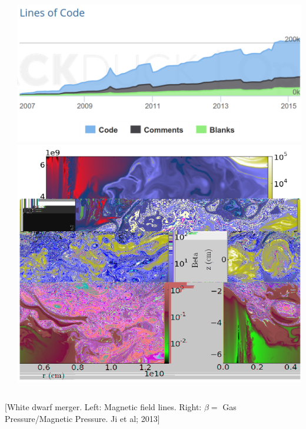 {\begin{columns}
\begin{column}{.48\textwidth}
  \end{column}
\begin{column}{.48\textwidth} 

\includegraphics[width=\textwidth,height=.5\textwidth]{pictures/ytlines.png} \\
\vspace{.6cm}
\includegraphics[width=\textwidth]{pictures/ji2_cropped.pdf}
\end{column}
\end{columns}
\begin{center}{ \tiny [White dwarf merger. Left: Magnetic field lines. Right: $\beta=$ Gas Pressure/Magnetic Pressure. Ji et al; 2013]}\end{center}
}

